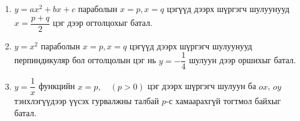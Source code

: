 \begin{enumerate}
\begin{enumerate}
  \item $x^m (a-x)^n \le 
    \dfrac{m^m n^n}{(m+n)^{m+n}}\, a^{m+n}$, хэрэв $m>0$, $n>0$, $0\le x\le a$.
  \item $\dfrac{x+a}{2^{(n-1)/n}} \le \sqrt[n]{x^n+a^n} \le x+a$, хэрэв $x>0,\, a>0,\, n>1$.
  \item $|a\sin x + b\cos x| \le \sqrt{a^2+b^2}$.
  \item $\dfrac{2}{3} \le \dfrac{x^2+1}{x^3+x+1} \le 2$, бүх $x \in \mathbb{R}$-д.
   \end{enumerate}
\item $y=ax^2+bx+c$ параболын $x=p, x=q$ цэгүүд дээрх шүргэгч шулуунууд $x=\dfrac{p+q}{2}$ цэг дээр огтолцохыг батал.
\item $y=x^2$ параболын $x=p, x=q$ цэгүүд дээрх шүргэгч шулуунууд перпиндикуляр бол огтолцолын цэг нь $y=-\dfrac{1}{4}$ шулуун дээр оршихыг батал.
\item $y=\dfrac{1}{x}$ функцийн $x=p ,\quad (p>0)$ цэг дээрх шүргэгч шулуун ба $ox$, $oy$ тэнхлэгүүдээр үүсэх гурвалжны талбай $p$-с хамаарахгүй тогтмол байхыг батал.
\end{enumerate}
